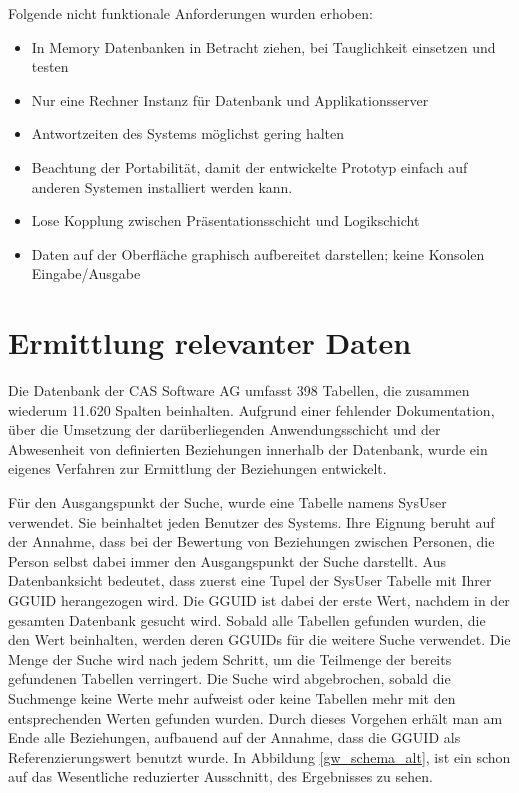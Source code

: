 Folgende nicht funktionale Anforderungen wurden erhoben:

\begin{itemize}

	\item In Memory Datenbanken in Betracht ziehen, bei Tauglichkeit einsetzen und testen
	
	\item Nur eine Rechner Instanz für Datenbank und Applikationsserver 
	
	\item Antwortzeiten des Systems möglichst gering halten
	
	\item Beachtung der Portabilität, damit der entwickelte Prototyp einfach auf anderen Systemen installiert werden kann.
	
	\item Lose Kopplung zwischen Präsentationsschicht und Logikschicht
	
	\item Daten auf der Oberfläche graphisch aufbereitet darstellen; keine Konsolen Eingabe/Ausgabe

\end{itemize}

\section{Ermittlung relevanter Daten}
\label{ch:Systemanalyse:sec:Information}

Die Datenbank der CAS Software AG umfasst 398 Tabellen, die zusammen wiederum 11.620 Spalten beinhalten. Aufgrund einer fehlender Dokumentation, über die Umsetzung der darüberliegenden Anwendungsschicht und der Abwesenheit von definierten Beziehungen innerhalb der Datenbank, wurde ein eigenes Verfahren zur Ermittlung der Beziehungen entwickelt. 

Für den Ausgangspunkt der Suche, wurde eine Tabelle namens SysUser verwendet. Sie beinhaltet jeden Benutzer des Systems. Ihre Eignung beruht auf der Annahme, dass bei der Bewertung von Beziehungen zwischen Personen, die Person selbst dabei immer den Ausgangspunkt der Suche darstellt. Aus Datenbanksicht bedeutet, dass zuerst eine Tupel der SysUser Tabelle mit Ihrer GGUID herangezogen wird. Die GGUID ist dabei der erste Wert, nachdem in der gesamten Datenbank gesucht wird. Sobald alle Tabellen gefunden wurden, die den Wert beinhalten, werden deren GGUIDs für die weitere Suche verwendet. Die Menge der Suche wird nach jedem Schritt, um die Teilmenge der bereits gefundenen Tabellen verringert. Die Suche wird abgebrochen, sobald die Suchmenge keine Werte mehr aufweist oder keine Tabellen mehr mit den entsprechenden Werten gefunden wurden. Durch dieses Vorgehen erhält man am Ende alle Beziehungen, aufbauend auf der Annahme, dass die GGUID als Referenzierungswert benutzt wurde. In Abbildung \ref{gw_schema_alt}, ist ein schon auf das Wesentliche reduzierter Ausschnitt, des Ergebnisses zu sehen. 

